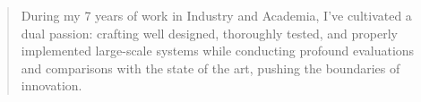 \documentclass[10pt,a4paper,ragged2e,withhyper]{altacv}
\begin{document}
\begin{paracol}{2}
        
        
        
        
        
        \newpage
        
        \switchcolumn
        
            \begin{quote}
            During my 7 years of work in Industry and Academia, I’ve cultivated a dual passion: crafting well designed, thoroughly tested, and properly implemented large-scale systems while conducting profound evaluations and comparisons with the state of the art, pushing the boundaries of innovation.  
            \end{quote}
        

\end{paracol}
\end{document}
